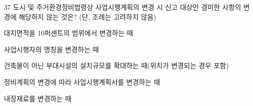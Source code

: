 \begin{question}{37}
도시 및 주거환경정비법령상 사업시행계획의 변경 시 신고 대상인 경미한 사항의 변경에 해당하지 않는 것은? (단, 조례는 고려하지 않음)
\begin{choices}
  \item 대지면적을 10퍼센트의 범위에서 변경하는 때
  \item 사업시행자의 명칭을 변경하는 때
  \item 건축물이 아닌 부대시설의 설치규모를 확대하는 때(위치가 변경되는 경우 포함)
  \item 정비계획의 변경에 따라 사업시행계획서를 변경하는 때
  \item 내장재료를 변경하는 때
\end{choices}
\end{question}
